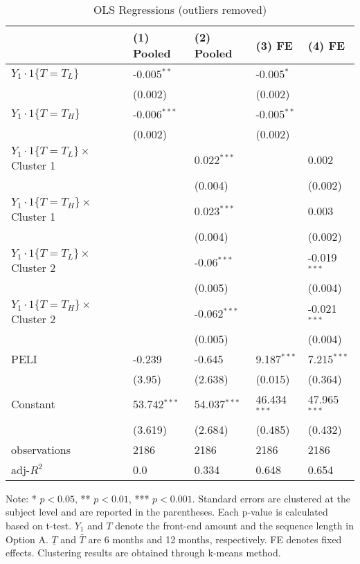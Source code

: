 \documentclass[12pt]{article}
\begin{document}
\begin{table}
    \caption{OLS Regressions (outliers removed)}
    \vspace*{12pt}
    \centering

      \begin{tabular}{lllll}
\hline
 & (1) Pooled & (2) Pooled & (3) FE & (4) FE \\
\hline
$Y_1\cdot1\{T=T_L\}$ & -0.005$^{**}$ &  & -0.005$^{*}$ &  \\
 & (0.002) &  & (0.002) &  \\
$Y_1\cdot1\{T=T_H\}$ & -0.006$^{***}$ &  & -0.005$^{**}$ &  \\
 & (0.002) &  & (0.002) &  \\
$Y_1\cdot1\{T=T_L\}\times$ Cluster 1 &  & 0.022$^{***}$ &  & 0.002 \\
 &  & (0.004) &  & (0.002) \\
$Y_1\cdot1\{T=T_H\}\times$ Cluster 1 &  & 0.023$^{***}$ &  & 0.003 \\
 &  & (0.004) &  & (0.002) \\
$Y_1\cdot1\{T=T_L\}\times$ Cluster 2 &  & -0.06$^{***}$ &  & -0.019$^{***}$ \\
 &  & (0.005) &  & (0.004) \\
$Y_1\cdot1\{T=T_H\}\times$ Cluster 2 &  & -0.062$^{***}$ &  & -0.021$^{***}$ \\
 &  & (0.005) &  & (0.004) \\
PELI & -0.239 & -0.645 & 9.187$^{***}$ & 7.215$^{***}$ \\
 & (3.95) & (2.638) & (0.015) & (0.364) \\
Constant & 53.742$^{***}$ & 54.037$^{***}$ & 46.434$^{***}$ & 47.965$^{***}$ \\
 & (3.619) & (2.684) & (0.485) & (0.432) \\\hline

observations & 2186 & 2186 & 2186 & 2186 \\
adj-$R^2$ & 0.0 & 0.334 & 0.648 & 0.654 \\
\hline
\end{tabular}

    \vspace*{4pt}
    \centering
    \begin{minipage}{0.85\textwidth}
    {\par\footnotesize Note: * $p<0.05$, ** $p<0.01$, *** $p<0.001$. Standard errors are clustered at the subject level and are reported in the parentheses. Each p-value is calculated based on t-test. $Y_1$ and $T$ denote the front-end amount and the sequence length in Option A. $\underline{T}$ and $\bar{T}$ are 6 months and 12 months, respectively. FE denotes fixed effects. Clustering results are obtained through k-means method.}
    \end{minipage}
    \label{tab:seq_value_ols}
\end{table}
\end{document}
